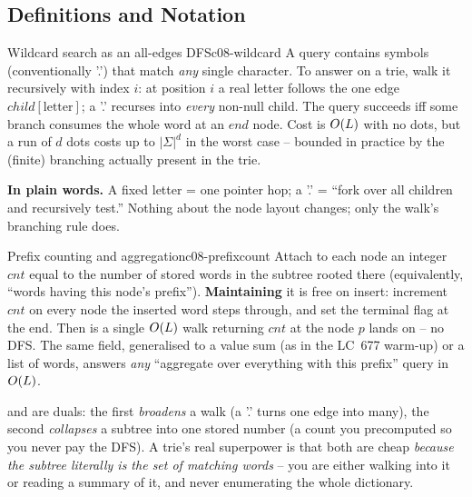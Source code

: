 \subsection{Definitions and Notation}

\begin{definition}{Wildcard search as an all-edges DFS}{c08-wildcard}
A  query contains symbols (conventionally '.') that match \emph{any} single character. To
answer  on a trie, walk it recursively with index $i$: at position $i$ a real
letter follows the one edge $\mathit{child}[\text{letter}]$; a '.' recurses into \emph{every} non-null
child. The query succeeds iff some branch consumes the whole word at an $\mathit{end}$ node. Cost is
$O(L)$ with no dots, but a run of $d$ dots costs up to $|\Sigma|^{d}$ in the worst case -- bounded
in practice by the (finite) branching actually present in the trie.
\end{definition}

\noindent\textbf{In plain words.} A fixed letter = one pointer hop; a '.' = ``fork over all children and
recursively test.'' Nothing about the node layout changes; only the walk's branching rule does.

\begin{definition}{Prefix counting and aggregation}{c08-prefixcount}
Attach to each node an integer $\mathit{cnt}$ equal to the number of stored words in the subtree rooted
there (equivalently, ``words having this node's prefix''). \textbf{Maintaining} it is free on insert:
increment $\mathit{cnt}$ on every node the inserted word steps through, and set the terminal flag at the
end. Then  is a single $O(L)$ walk returning $\mathit{cnt}$ at the node $p$
lands on -- no DFS. The same field, generalised to a value sum (as in the LC~677 warm-up) or a list of
words, answers \emph{any} ``aggregate over everything with this prefix'' query in $O(L)$.
\end{definition}

\begin{insightbox}
 and  are duals: the first \emph{broadens} a walk (a '.'
turns one edge into many), the second \emph{collapses} a subtree into one stored number (a count you
precomputed so you never pay the DFS). A trie's real superpower is that both are cheap \emph{because the
subtree literally is the set of matching words} -- you are either walking into it or reading a summary
of it, and never enumerating the whole dictionary.
\end{insightbox}


